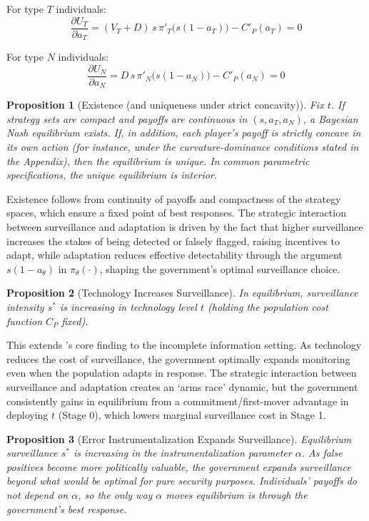 \documentclass[11pt,a4paper]{article}
\newtheorem{proposition}{Proposition}
\theoremstyle{definition}
\theoremstyle{remark}
\theoremstyle{definition}
\begin{document}
For type $T$ individuals:
\begin{equation}
    \frac{\partial U_T}{\partial a_T}
    = (V_T + D)\, s \,\pi'_T\!\big(s(1-a_T)\big) - C'_P(a_T) = 0
\end{equation}

For type $N$ individuals:
\begin{equation}
    \frac{\partial U_N}{\partial a_N}
    = D\, s \,\pi'_N\!\big(s(1-a_N)\big) - C'_P(a_N) = 0    
\end{equation}

\begin{proposition}[Existence (and uniqueness under strict concavity)]
Fix $t$. If strategy sets are compact and payoffs are continuous in $(s,a_T,a_N)$, a Bayesian Nash equilibrium exists.
If, in addition, each player's payoff is strictly concave in its own action (for instance, under the curvature-dominance conditions stated in the Appendix),
then the equilibrium is unique. In common parametric specifications, the unique equilibrium is interior.
\end{proposition}

Existence follows from continuity of payoffs and compactness of the strategy spaces, which ensure a fixed point of best responses. 
The strategic interaction between surveillance and adaptation is driven by the fact that higher surveillance increases the stakes of being 
detected or falsely flagged, raising incentives to adapt, while adaptation reduces effective detectability through the argument $s(1-a_\theta)$ 
in $\pi_\theta(\cdot)$, shaping the government's optimal surveillance choice. 

\begin{proposition}[Technology Increases Surveillance]
    In equilibrium, surveillance intensity $s^*$ is increasing in technology level $t$ (holding the population cost function $C_P$ fixed).
\end{proposition}    

This extends \citet{dragu2021digital}'s core finding to the incomplete information setting. As technology reduces the cost of surveillance, the 
government optimally expands monitoring even when the population adapts in response. The strategic interaction between surveillance and adaptation 
creates an `arms race' dynamic, but the government consistently gains in equilibrium from a commitment/first-mover advantage in deploying $t$ 
(Stage 0), which lowers marginal surveillance cost in Stage 1.

\begin{proposition}[Error Instrumentalization Expands Surveillance]
Equilibrium surveillance $s^*$ is increasing in the instrumentalization parameter $\alpha$. As false positives become more politically valuable, 
the government expands surveillance beyond what would be optimal for pure security purposes. Individuals' payoffs do not depend on $\alpha$, 
so the only way $\alpha$ moves equilibrium is through the government's best response.
\end{proposition}
\end{document}
